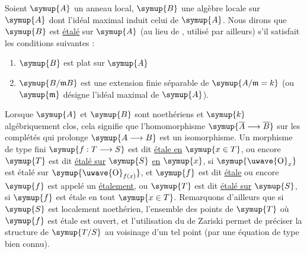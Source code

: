  Soient $\symup{A}$ un anneau local, $\symup{B}$ une algèbre locale sur $\symup{A}$ dont l'idéal maximal
induit celui de $\symup{A}$. Nous dirons que $\symup{B}$ est \uline{étalé} sur $\symup{A}$ (au lieu de
, utilisé par ailleurs) s'il satisfait les conditions suivantes :
\begin{enumerate}
\item[(i)] $\symup{B}$ est plat sur $\symup{A}$
\item[(ii)] $\symup{B/\mathfrak mB}$ est une extension finie séparable de
$\symup{A/\mathfrak m=k}$ (ou $\symup{\mathfrak m}$ désigne l'idéal maximal de $\symup{A}$).
\end{enumerate}
Lorsque $\symup{A}$ et $\symup{B}$ sont noethériens et $\symup{k}$ algébriquement clos, cela signifie
que l'homomorphisme $\symup{\overline A\longrightarrow\overline B}$ sur les complétés qui
prolonge $\symup{A\longrightarrow B}$ est un isomorphisme. Un morphisme de type fini
$\symup{f:T\longrightarrow S}$ est dit \uline{étale en} $\symup{x\in T}$, ou encore $\symup{T}$ est dit
\uline{étalé sur} $\symup{S}$ \uline{en} $\symup{x}$, si $\symup{\text{\uwave{O}}_x}$ est étalé sur
$\symup{\text{\uwave{O}}_{f(x)}}$, et $\symup{f}$ est dit \uline{étale} ou encore $\symup{f}$ est appelé un
\uline{étalement}, ou $\symup{T}$ est dit \uline{étalé sur} $\symup{S}$, si $\symup{f}$ est étale en tout
$\symup{x\in T}$. Remarquons d'ailleurs que si $\symup{S}$ est localement noethérien,
l'ensemble des points de $\symup{T}$ où $\symup{f}$ est étale est ouvert, et l'utilisation du
 de Zariski permet de préciser la structure de $\symup{T/S}$ au
voisinage d'un tel point (par une équation de type bien connu).

